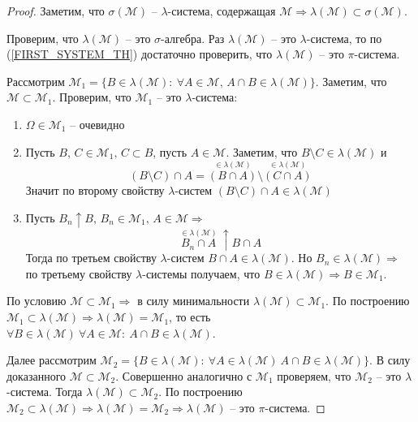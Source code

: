 \documentclass[a4paper,12pt]{article}
\theoremstyle{plain}
\theoremstyle{definition}
\theoremstyle{remark}
\begin{document}
\begin{proof}
	Заметим, что $\sigma(\mathcal{M})$ -- $\lambda$-система, содержащая $\mathcal{M} \Rightarrow \lambda(\mathcal{M}) \subset \sigma(\mathcal{M})$.

	Проверим, что $\lambda(\mathcal{M})$ -- это $\sigma$-алгебра. Раз $\lambda(\mathcal{M})$ -- это $\lambda$-система, то по (\ref{FIRST_SYSTEM_TH}) достаточно проверить, что $\lambda(\mathcal{M})$ -- это $\pi$-система.

	Рассмотрим $\mathcal{M}_1 = \{B \in \lambda(\mathcal{M}):\: \forall A \in \mathcal{M},\, A \cap B \in \lambda(\mathcal{M})\}$. Заметим, что $\mathcal{M} \subset \mathcal{M}_1$. Проверим, что $\mathcal{M}_1$ -- это $\lambda$-система:
	\begin{enumerate}
		\item $\Omega \in \mathcal{M}_1$ -- очевидно
		\item Пусть $B,\, C \in \mathcal{M}_1,\, C \subset B$, пусть $A \in \mathcal{M}$. Заметим, что $B \setminus C \in \lambda(\mathcal{M})$ и
		      \[(B \setminus C) \cap A = \stackrel{\in \lambda(\mathcal{M})}{(B \cap A)} \setminus \stackrel{\in \lambda(\mathcal{M})}{(C \cap A)}\]
		      Значит по второму свойству $\lambda$-систем $(B \setminus C) \cap A \in \lambda(\mathcal{M})$
		\item Пусть $B_n \uparrow B,\, B_n \in \mathcal{M}_1,\, A \in \mathcal{M} \Rightarrow$
		      \[\stackrel{\in \lambda(\mathcal{M})}{B_n \cap A}\: \uparrow B \cap A\]
		      Тогда по третьем свойству $\lambda$-систем $B \cap A \in \lambda(\mathcal{M})$. Но $B_n \in \lambda(\mathcal{M}) \Rightarrow$ по третьему свойству $\lambda$-системы получаем, что $B \in \lambda(\mathcal{M}) \Rightarrow B \in \mathcal{M}_1$.
	\end{enumerate}
	По условию $\mathcal{M} \subset \mathcal{M}_1 \Rightarrow$ в силу минимальности $\lambda(\mathcal{M}) \subset \mathcal{M}_1$. По построению $\mathcal{M}_1 \subset \lambda(\mathcal{M}) \Rightarrow \lambda(\mathcal{M}) = \mathcal{M}_1$, то есть $\forall B \in \lambda(\mathcal{M}) \: \forall A \in \mathcal{M} :\: A \cap B \in \lambda(\mathcal{M})$.

	Далее рассмотрим $\mathcal{M}_2 = \{B \in \lambda(\mathcal{M}):\: \forall A \in \lambda(\mathcal{M}) \: A \cap B \in \lambda(\mathcal{M})\}$. В силу доказанного $\mathcal{M} \subset \mathcal{M}_2$. Совершенно аналогично с $\mathcal{M}_1$ проверяем, что $\mathcal{M}_2$ -- это $\lambda$-система. Тогда $\lambda(\mathcal{M}) \subset \mathcal{M}_2$. По построению $\mathcal{M}_2 \subset \lambda(\mathcal{M}) \Rightarrow \lambda(\mathcal{M}) = \mathcal{M}_2 \Rightarrow \lambda(\mathcal{M})$ -- это $\pi$-система.
\end{proof}
\end{document}
